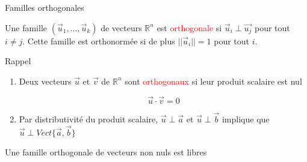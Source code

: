 
\begin{parag}{Familles orthogonales}
    \begin{definition}
        Une famille $(\vec{u}_1, \dots, \vec{u}_k)$ de vecteurs $\mathbb{R}^n$ est \textcolor{red}{orthogonale} si $\vec{u}_i \perp \vec{u_j}$ pour tout $i \neq j$. Cette famille est orthonormée si de plus $||\vec{u}_i|| = 1$ pour tout $i$.
    \end{definition}
    \begin{subparag}{Rappel}
        \begin{enumerate}
            \item Deux vecteurs $\vec{u}$ et $\vec{v}$ de $\mathbb{R}^n$ sont \textcolor{red}{orthogonaux} si leur produit scalaire est nul
            \begin{formule}
            \[\vec{u}\cdot \vec{v} = 0\]
            \end{formule}
            \item Par distributivité du produit scalaire, $\vec{u}\perp\vec{a}$ et $\vec{u} \perp \vec{b}$ implique que
            $\vec{u} \perp Vect\{\vec{a}, \vec{b}\}$
        \end{enumerate}
        \begin{theoreme}
            Une famille orthogonale de vecteurs non nuls est libres
        \end{theoreme}
    \end{subparag}
\end{parag}
